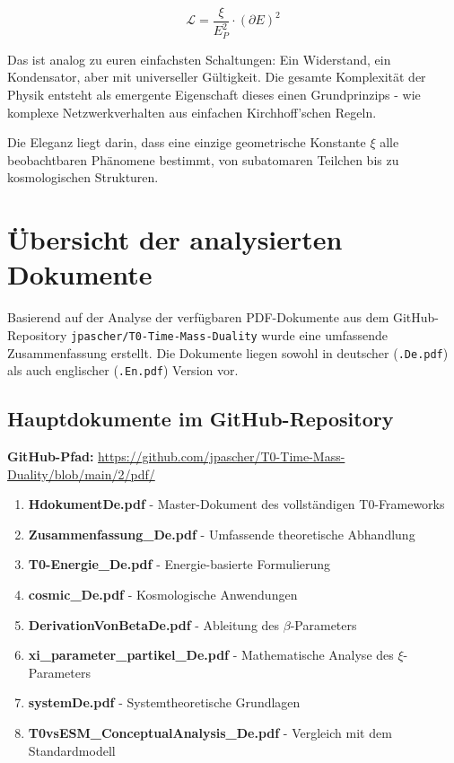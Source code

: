 \documentclass[12pt,a4paper]{article}
\newcommand{\xipar}{\xi}
\begin{document}
$$\mathcal{L} = \frac{\xi}{E_P^2} \cdot (\partial E)^2$$

Das ist analog zu euren einfachsten Schaltungen: Ein Widerstand, ein Kondensator, aber mit universeller Gültigkeit. Die gesamte Komplexität der Physik entsteht als emergente Eigenschaft dieses einen Grundprinzips - wie komplexe Netzwerkverhalten aus einfachen Kirchhoff'schen Regeln.

Die Eleganz liegt darin, dass eine einzige geometrische Konstante $\xi$ alle beobachtbaren Phänomene bestimmt, von subatomaren Teilchen bis zu kosmologischen Strukturen.
	
	\section{Übersicht der analysierten Dokumente}
	
	Basierend auf der Analyse der verfügbaren PDF-Dokumente aus dem GitHub-Repository \texttt{jpascher/T0-Time-Mass-Duality} wurde eine umfassende Zusammenfassung erstellt. Die Dokumente liegen sowohl in deutscher (\texttt{.De.pdf}) als auch englischer (\texttt{.En.pdf}) Version vor.
	
	\subsection{Hauptdokumente im GitHub-Repository}
	
	\textbf{GitHub-Pfad:} \url{https://github.com/jpascher/T0-Time-Mass-Duality/blob/main/2/pdf/}
	
	\begin{enumerate}
		\item \textbf{HdokumentDe.pdf} - Master-Dokument des vollständigen T0-Frameworks
		\item \textbf{Zusammenfassung\_De.pdf} - Umfassende theoretische Abhandlung
		\item \textbf{T0-Energie\_De.pdf} - Energie-basierte Formulierung
		\item \textbf{cosmic\_De.pdf} - Kosmologische Anwendungen
		\item \textbf{DerivationVonBetaDe.pdf} - Ableitung des $\beta$-Parameters
		\item \textbf{xi\_parameter\_partikel\_De.pdf} - Mathematische Analyse des $\xipar$-Parameters
		\item \textbf{systemDe.pdf} - Systemtheoretische Grundlagen
		\item \textbf{T0vsESM\_ConceptualAnalysis\_De.pdf} - Vergleich mit dem Standardmodell
	\end{enumerate}
	
\end{document}

